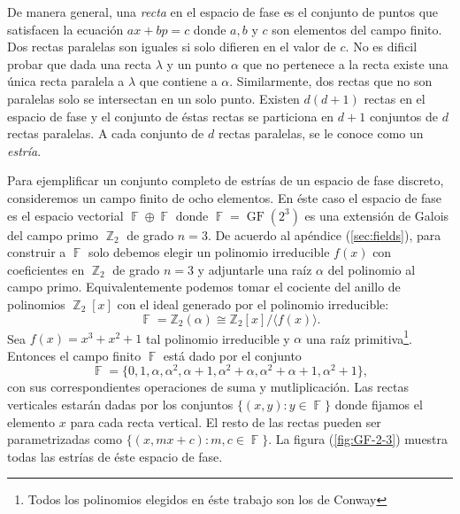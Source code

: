 \documentclass[a4paper,11pt]{report}
\DeclareMathOperator{\Z}{\mathbb{Z}}
\DeclareMathOperator{\F}{\mathbb{F}}
\DeclareMathOperator{\GF}{GF}
\begin{document}
  De manera general, una \textit{recta} en el espacio
  de fase es el conjunto de puntos que satisfacen la
  ecuación $ax + bp = c$ donde $a,b$ y $c$ son elementos del
  campo finito. Dos rectas paralelas son iguales si solo
  difieren en el valor de $c$.  No es dificil probar que
  dada una recta $\lambda$ y un punto $\alpha$ que no
  pertenece a la recta existe una única recta paralela a
  $\lambda$ que contiene a $\alpha$.  Similarmente, dos
  rectas que no son paralelas solo se intersectan en un solo
  punto. Existen $d(d+1)$ rectas en el espacio de fase y el
  conjunto de éstas rectas se particiona en $d+1$ conjuntos
  de $d$ rectas paralelas. A cada conjunto de $d$ rectas
  paralelas, se le conoce como un \textit{estría}. 

  Para ejemplificar un conjunto completo de estrías de un
  espacio de fase discreto, consideremos un campo finito de
  ocho elementos. En éste caso el espacio de fase es el
  espacio vectorial $\F \oplus \F$ donde $\F =
  \GF\left(2^3\right)$ es una extensión de Galois del campo
  primo $\Z_2$ de grado $n = 3$. De acuerdo al apéndice
  (\ref{sec:fields}), para construir a $\F$ solo debemos
  elegir un polinomio irreducible $f(x)$ con coeficientes en
  $\Z_2$ de grado $n = 3$ y adjuntarle una raíz $\alpha$ del
  polinomio al campo primo. Equivalentemente podemos tomar
  el cociente del anillo de polinomios $\Z_2[x]$ con el
  ideal generado por el polinomio irreducible:
  \begin{equation}
    \F
    = \mathbb Z_2(\alpha)
    \cong \mathbb Z_2[x] / \langle f(x) \rangle.
  \end{equation} 
  Sea $f(x) = x^3+x^2+1$ tal polinomio irreducible y
  $\alpha$ una raíz primitiva\footnote{Todos los polinomios
  elegidos en éste trabajo son los de Conway}. Entonces el
  campo finito $\F$ está dado por el conjunto
  \begin{equation}
    \F
    = \{
      0, 1, \alpha, \alpha^2, \alpha+1, \alpha^2+\alpha,
      \alpha^2 + \alpha + 1, \alpha^2 + 1
    \},
  \end{equation} 
  con sus correspondientes operaciones de suma y
  mutliplicación. Las rectas verticales estarán dadas por
  los conjuntos $\{(x,y) : y \in \F\}$ donde fijamos el
  elemento $x$ para cada recta vertical. El resto de las
  rectas pueden ser parametrizadas como $\{(x,mx+c) : m, c
  \in \F\}$. La figura (\ref{fig:GF-2-3}) muestra todas las
  estrías de éste espacio de fase.
\end{document}
